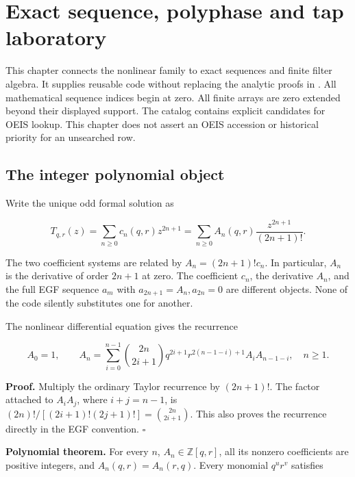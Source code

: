 \hypertarget{exact-sequence-polyphase-and-tap-laboratory}{%
\section{Exact sequence, polyphase and tap
laboratory}\label{exact-sequence-polyphase-and-tap-laboratory}}



This chapter connects the nonlinear family to exact sequences and finite
filter algebra. It supplies reusable code without replacing the analytic
proofs in . All mathematical
sequence indices begin at zero. All finite arrays are zero extended
beyond their displayed support. The catalog contains explicit candidates
for OEIS lookup. This chapter does not assert an OEIS accession or
historical priority for an unsearched row.

\hypertarget{the-integer-polynomial-object}{%
\subsection{The integer polynomial
object}\label{the-integer-polynomial-object}}

Write the unique odd formal solution as

\[
T_{q,r}(z)=\sum_{n\ge0}c_n(q,r)z^{2n+1}
          =\sum_{n\ge0}A_n(q,r)\frac{z^{2n+1}}{(2n+1)!}.
\]

The two coefficient systems are related by \(A_n=(2n+1)!c_n\). In
particular, \(A_n\) is the derivative of order \(2n+1\) at zero. The
coefficient \(c_n\), the derivative \(A_n\), and the full EGF sequence
\(a_m\) with \(a_{2n+1}=A_n, a_{2n}=0\) are different objects. None of
the code silently substitutes one for another.

The nonlinear differential equation gives the recurrence

\[
\boxed{
A_0=1,\qquad
A_n=\sum_{i=0}^{n-1}\binom{2n}{2i+1}
 q^{2i+1}r^{2(n-1-i)+1}A_i A_{n-1-i},\quad n\ge1.}
\]

\textbf{Proof.} Multiply the ordinary Taylor recurrence by \((2n+1)!\).
The factor attached to \(A_iA_j\), where \(i+j=n-1\), is
\((2n)!/[(2i+1)!(2j+1)!]=\binom{2n}{2i+1}\). This also proves the
recurrence directly in the EGF convention. \(\square\)

\textbf{Polynomial theorem.} For every \(n\), \(A_n\in\mathbb Z[q,r]\),
all its nonzero coefficients are positive integers, and
\(A_n(q,r)=A_n(r,q)\). Every monomial \(q^u r^v\) satisfies


